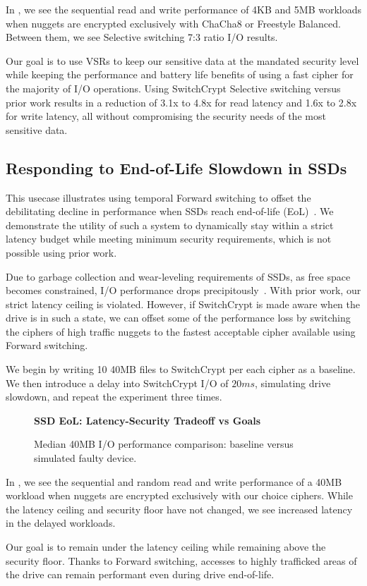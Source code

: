 In , we see the sequential read and write performance of
4KB and 5MB workloads when nuggets are encrypted exclusively with ChaCha8 or
Freestyle Balanced. Between them, we see Selective switching 7:3 ratio I/O
results.

Our goal is to use VSRs to keep our sensitive data at the mandated security
level while keeping the performance and battery life benefits of using a fast
cipher for the majority of I/O operations. Using SwitchCrypt Selective switching
versus prior work results in a reduction of 3.1x to 4.8x for read latency and
1.6x to 2.8x for write latency, all without compromising the security needs of
the most sensitive data.

\subsection{Responding to End-of-Life Slowdown in SSDs} \label{subsec:uc3}

This usecase illustrates using temporal Forward switching to offset the
debilitating decline in performance when SSDs reach end-of-life
(EoL)~\cite{SSDEOL1}. We demonstrate the utility of such a system to dynamically
stay within a strict latency budget while meeting minimum security requirements,
which is not possible using prior work.

Due to garbage collection and wear-leveling requirements of SSDs, as free space
becomes constrained, I/O performance drops precipitously~\cite{SSDEOL1}. With
prior work, our strict latency ceiling is violated. However, if SwitchCrypt is
made aware when the drive is in such a state, we can offset some of the
performance loss by switching the ciphers of high traffic nuggets to the fastest
acceptable cipher available using Forward switching.

We begin by writing 10 40MB files to SwitchCrypt per each cipher as a baseline.
We then introduce a delay into SwitchCrypt I/O of $20ms$, simulating drive
slowdown, and repeat the experiment three times.

\begin{figure}[ht] \textbf{SSD EoL: Latency-Security Tradeoff vs
   Goals}\par\medskip {} \caption{Median
   40MB I/O performance comparison: baseline versus simulated faulty device.}
  \label{fig:usecase-eol-tradeoff}
\end{figure}

In , we see the sequential and random read and
write performance of a 40MB workload when nuggets are encrypted exclusively with
our choice ciphers. While the latency ceiling and security floor have not
changed, we see increased latency in the delayed workloads.

Our goal is to remain under the latency ceiling while remaining above
the security floor. Thanks to Forward switching, accesses to highly
trafficked areas of the drive can remain performant even during drive
end-of-life.  
